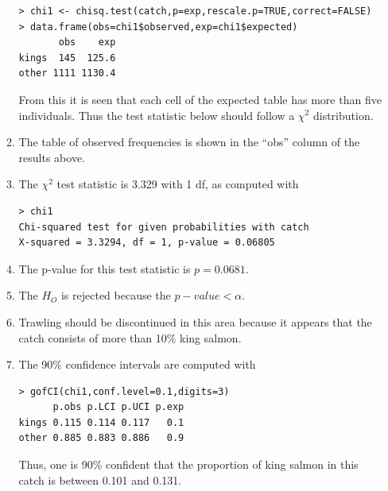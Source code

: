 \documentclass[10pt,openany]{book}\usepackage[]{graphicx}\usepackage[]{color}
\makeatletter
\newenvironment{kframe}{%
 \def\at@end@of@kframe{}%
 \ifinner\ifhmode%
  \def\at@end@of@kframe{\end{minipage}}%
  \begin{minipage}{\columnwidth}%
 \fi\fi%
 \def\FrameCommand##1{\hskip\@totalleftmargin \hskip-\fboxsep
 \colorbox{shadecolor}{##1}\hskip-\fboxsep
     \hskip-\linewidth \hskip-\@totalleftmargin \hskip\columnwidth}%
 \MakeFramed {\advance\hsize-\width
   \@totalleftmargin\z@ \linewidth\hsize
   \@setminipage}}%
 {\par\unskip\endMakeFramed%
 \at@end@of@kframe}
\newenvironment{knitrout}{}{} %
\makeatother
\begin{document}
\begin{itemize}
\begin{enumerate}
\begin{knitrout}
\color{fgcolor}\begin{kframe}
\begin{verbatim}
> chi1 <- chisq.test(catch,p=exp,rescale.p=TRUE,correct=FALSE)
> data.frame(obs=chi1$observed,exp=chi1$expected)
       obs    exp
kings  145  125.6
other 1111 1130.4
\end{verbatim}
\end{kframe}
\end{knitrout}
From this it is seen that each cell of the expected table has more than five individuals.  Thus the test statistic below should follow a $\chi^{2}$ distribution.
      \item The table of observed frequencies is shown in the ``obs'' column of the results above.
      \item The $\chi^{2}$ test statistic is 3.329 with 1 df, as computed with
\begin{knitrout}
\color{fgcolor}\begin{kframe}
\begin{verbatim}
> chi1
Chi-squared test for given probabilities with catch 
X-squared = 3.3294, df = 1, p-value = 0.06805
\end{verbatim}
\end{kframe}
\end{knitrout}
      \item The p-value for this test statistic is $p=0.0681$.
      \item The $H_{O}$ is rejected because the $p-value<\alpha$.
      \item Trawling should be discontinued in this area because it appears that the catch consists of more than 10\% king salmon.
      \item The 90\% confidence intervals are computed with
\begin{knitrout}
\color{fgcolor}\begin{kframe}
\begin{verbatim}
> gofCI(chi1,conf.level=0.1,digits=3)
      p.obs p.LCI p.UCI p.exp
kings 0.115 0.114 0.117   0.1
other 0.885 0.883 0.886   0.9
\end{verbatim}
\end{kframe}
\end{knitrout}
Thus, one is 90\% confident that the proportion of king salmon in this catch is between 0.101 and 0.131.
    \end{enumerate}

\end{itemize}

  \backmatter
    
\end{document}
